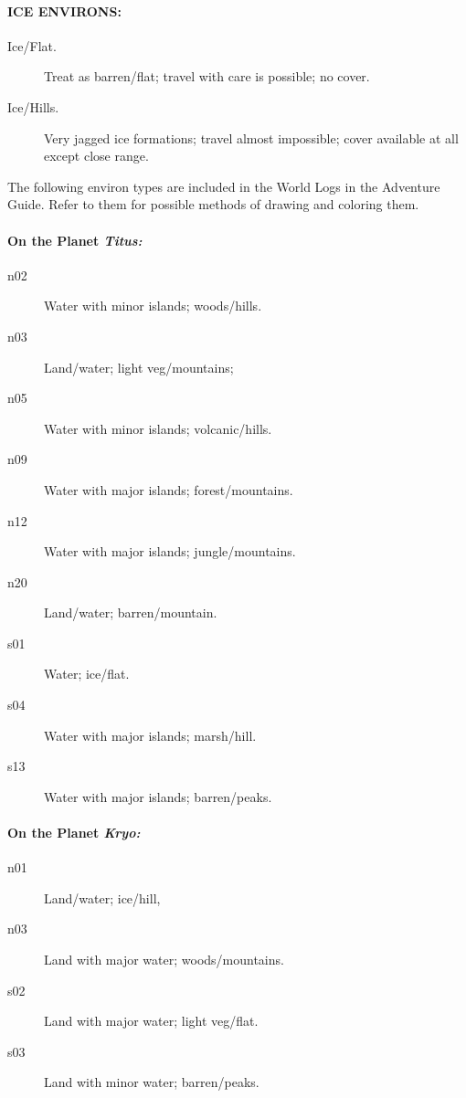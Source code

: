 \paragraph{ICE ENVIRONS:}

\begin{description}
\item[Ice/Flat.] Treat as barren/flat; travel with care is possible;
  no cover.
\item[Ice/Hills.] Very jagged ice formations; travel almost
  impossible; cover available at all except close range.
\end{description}

The following environ types are included in the World Logs in the
Adventure Guide. Refer to them for possible methods of drawing and
coloring them.


\paragraph{On the Planet \emph{Titus:}}

\begin{description}
\item[n02] Water with minor islands; woods/hills.
\item[n03] Land/water; light veg/mountains;
\item[n05] Water with minor islands; volcanic/hills.
\item[n09] Water with major islands; forest/mountains.
\item[n12] Water with major islands; jungle/mountains.
\item[n20] Land/water; barren/mountain.
\item[s01] Water; ice/flat.
\item[s04] Water with major islands; marsh/hill.
\item[s13] Water with major islands; barren/peaks.
\end{description}

\paragraph{On the Planet \emph{Kryo:}}


\begin{description}
\item[n01] Land/water; ice/hill,
\item[n03] Land with major water; woods/mountains.
\item[s02] Land with major water; light veg/flat.
\item[s03] Land with minor water; barren/peaks.
\end{description}


